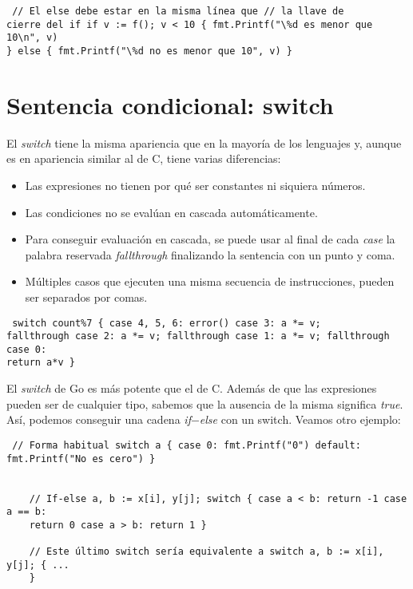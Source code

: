 \begin{verbatim} // El else debe estar en la misma línea que // la llave de
cierre del if if v := f(); v < 10 { fmt.Printf("\%d es menor que 10\n", v)
} else { fmt.Printf("\%d no es menor que 10", v) } \end{verbatim}

\section{Sentencia condicional: switch}

El \textit{switch} tiene la misma apariencia que en la mayoría de los lenguajes
y, aunque es en apariencia similar al de C, tiene varias diferencias:

\begin{itemize} \item Las expresiones no tienen por qué ser constantes ni
siquiera números.  \item Las condiciones no se evalúan en cascada
automáticamente.  \item Para conseguir evaluación en cascada, se puede usar al
final de cada \textit{case} la palabra reservada \textit{fallthrough}
finalizando la sentencia con un punto y coma.  \item Múltiples casos que
ejecuten una misma secuencia de instrucciones, pueden ser separados por comas.
\end{itemize}

\begin{verbatim} switch count%7 { case 4, 5, 6: error() case 3: a *= v;
fallthrough case 2: a *= v; fallthrough case 1: a *= v; fallthrough case 0:
return a*v } \end{verbatim}

El \textit{switch} de Go es más potente que el de C. Además de que las
expresiones pueden ser de cualquier tipo, sabemos que la ausencia de la misma
significa \textit{true}. Así, podemos conseguir una cadena
\textit{if}$-$\textit{else} con un switch. Veamos otro ejemplo:

\begin{verbatim} // Forma habitual switch a { case 0: fmt.Printf("0") default:
fmt.Printf("No es cero") }
    
    
	// If-else a, b := x[i], y[j]; switch { case a < b: return -1 case a == b:
	return 0 case a > b: return 1 }
    
	// Este último switch sería equivalente a switch a, b := x[i], y[j]; { ...
	} \end{verbatim}

